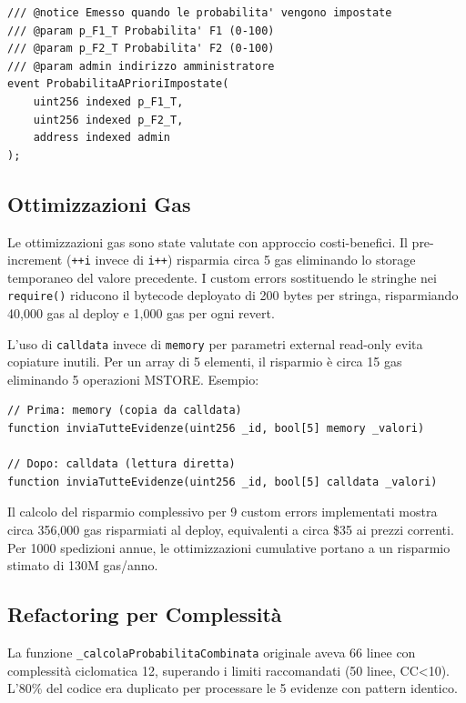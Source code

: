 \documentclass[12pt,a4paper]{article}
\begin{document}
\begin{lstlisting}[language=Solidity]
/// @notice Emesso quando le probabilita' vengono impostate
/// @param p_F1_T Probabilita' F1 (0-100)
/// @param p_F2_T Probabilita' F2 (0-100)
/// @param admin indirizzo amministratore
event ProbabilitaAPrioriImpostate(
    uint256 indexed p_F1_T, 
    uint256 indexed p_F2_T, 
    address indexed admin
);
\end{lstlisting}

\subsection{Ottimizzazioni Gas}

Le ottimizzazioni gas sono state valutate con approccio costi-benefici. Il pre-increment (\texttt{++i} invece di \texttt{i++}) risparmia circa 5 gas eliminando lo storage temporaneo del valore precedente. I custom errors sostituendo le stringhe nei \texttt{require()} riducono il bytecode deployato di 200 bytes per stringa, risparmiando 40,000 gas al deploy e 1,000 gas per ogni revert.

L'uso di \texttt{calldata} invece di \texttt{memory} per parametri external read-only evita copiature inutili. Per un array di 5 elementi, il risparmio è circa 15 gas eliminando 5 operazioni MSTORE. Esempio:

\begin{lstlisting}[language=Solidity]
// Prima: memory (copia da calldata)
function inviaTutteEvidenze(uint256 _id, bool[5] memory _valori)

// Dopo: calldata (lettura diretta)
function inviaTutteEvidenze(uint256 _id, bool[5] calldata _valori)
\end{lstlisting}

Il calcolo del risparmio complessivo per 9 custom errors implementati mostra circa 356,000 gas risparmiati al deploy, equivalenti a circa \$35 ai prezzi correnti. Per 1000 spedizioni annue, le ottimizzazioni cumulative portano a un risparmio stimato di 130M gas/anno.

\subsection{Refactoring per Complessità}

La funzione \texttt{\_calcolaProbabilitaCombinata} originale aveva 66 linee con complessità ciclomatica 12, superando i limiti raccomandati (50 linee, CC<10). L'80\% del codice era duplicato per processare le 5 evidenze con pattern identico.
\end{document}
